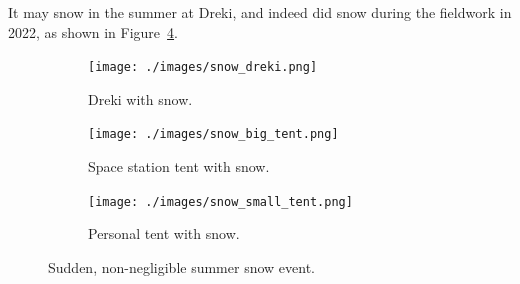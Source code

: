 It may snow in the summer at Dreki, and indeed did snow during the fieldwork in 2022,
as shown in Figure~\ref{figure:snow}.

\begin{figure}
	\centering
	\begin{subfigure}{0.49\textwidth}
	\texttt{[image: ./images/snow\_dreki.png]}
		\caption{Dreki with snow.}
	\label{figure:snow_dreki}
	\end{subfigure}
	\centering
	\begin{subfigure}{0.49\textwidth}
	\texttt{[image: ./images/snow\_big\_tent.png]}
	\caption{Space station tent with snow.}
	\label{figure:snow_space_station_tent}
	\end{subfigure}
	\begin{subfigure}{0.49\textwidth}
	\texttt{[image: ./images/snow\_small\_tent.png]}
	\caption{Personal tent with snow.}
	\label{figure:snow_personal_tent}
	\end{subfigure}
	\caption{Sudden, non-negligible summer snow event.}
	\label{figure:snow}
\end{figure}


